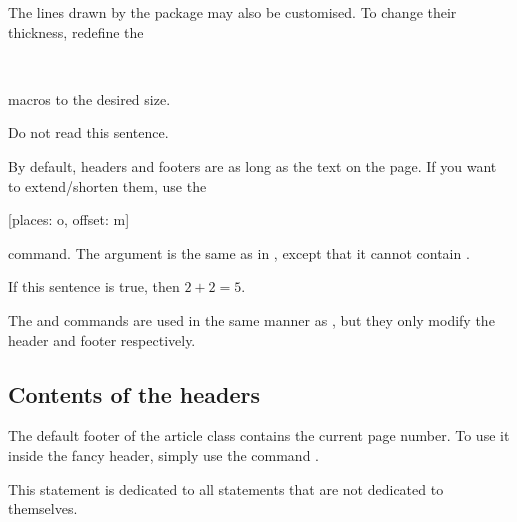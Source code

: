 The lines drawn by the  package may also be customised. To change
their thickness, redefine the
\begin{lscommand}
   \\
\end{lscommand}
macros to the desired size.
\begin{example}[standalone, paperheight=3cm, paperwidth=3cm]
\geometry{includefoot, includehead, headsep=.5em, footskip=1em} %
\sloppy %
\usepackage{fancyhdr} %
\pagestyle{fancy} %
\RenewDocumentCommand{\headrulewidth}{}{.2cm}
\RenewDocumentCommand{\footrulewidth}{}{.5cm}

\noindent %
Do not read this sentence.
\end{example}

By default, headers and footers are as long as the text on the page. If you want
to extend\slash{}shorten them, use the
\begin{lscommand}
  [places: o, offset: m]
\end{lscommand}
command. The  argument is the same as in , except that
it cannot contain .
\begin{example}[standalone, paperheight=3cm]
\geometry{includehead, includefoot, headsep=.5em, footskip=1em} %
\sloppy %
\usepackage{fancyhdr}%
\pagestyle{fancy}%
\fancyhfoffset[L]{-1cm}
\fancyhfoffset[R]{.2cm}

\noindent %
If this sentence is true,
then \(2 + 2 = 5\).
\end{example}
The  and  commands are used in the
same manner as , but they only modify the header and footer respectively.

\subsection{Contents of the headers}


The default footer of the article class contains the current page number. To
use it inside the fancy header, simply use the command .
\begin{example}[standalone, paperheight=2.5cm, to_page=2, vertical_pages]
\geometry{includehead, includefoot, headsep=.5em, footskip=1em} %
\sloppy %
\usepackage{fancyhdr}%
\pagestyle{fancy}%

\noindent %
This statement is dedicated to
all statements that are not
dedicated to themselves.
\end{example}

